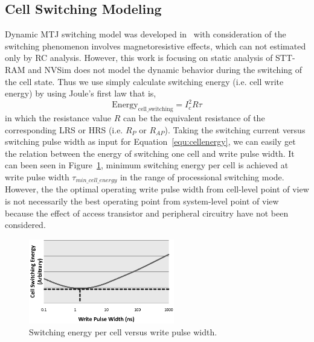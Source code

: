 \subsection{Cell Switching Modeling}
Dynamic MTJ switching model was developed in~\cite{STTRAM:Purdue10} with consideration of the switching phenomenon involves magnetoresistive effects, which can not estimated only by RC analysis.  However, this work is focusing on static analysis of STT-RAM and NVSim does not model the dynamic behavior during the switching of the cell state. Thus we use simply calculate switching energy (i.e. cell write energy) by using Joule's first law that is,
\begin{equation}
\mathrm{Energy}_{\mathrm{cell\_switching}} = I_{c}^2 R \tau \label{equ:cellenergy}
\end{equation}
in which the resistance value $R$ can be the equivalent resistance of the corresponding LRS or HRS (i.e. $R_{P}$ or $R_{AP}$). Taking the switching current versus switching pulse width as input for Equation~\ref{equ:cellenergy}, we can easily get the relation between the energy of switching one cell and write pulse width. It can been seen in Figure~\ref{fig:cellenergy}, minimum switching energy per cell is achieved at write pulse width $\tau_{min\_cell\_energy}$ in the range of processional switching mode. However, the the optimal operating write pulse width from cell-level point of view is not necessarily the best operating point from system-level point of view because the effect of access transistor and peripheral circuitry have not been considered.
\begin{figure}[t]
  \centering
  \includegraphics[width=2.5in]{fig/cellenergy.eps}
  \caption{Switching energy per cell versus write pulse width.}
  \label{fig:cellenergy}
\end{figure}

